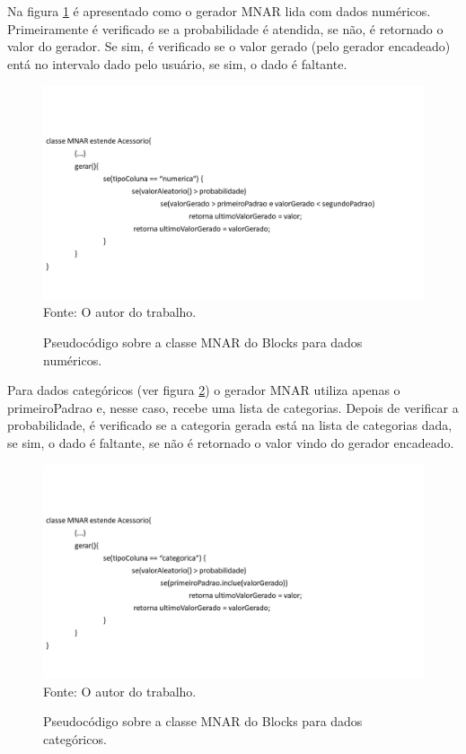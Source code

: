 \documentclass[
	12pt,				%
	openright,			%
	oneside,			%
	a4paper,			%
	english,			%
	brazil				%
	]{abntex2}
\begin{document}
		\par
		Na figura \ref{fig:MNARNum} é apresentado como o gerador MNAR lida com dados numéricos.
		Primeiramente é verificado se a probabilidade é atendida, se não, é retornado o valor do gerador.
		Se sim, é verificado se o valor gerado (pelo gerador encadeado) entá no intervalo dado pelo usuário, se sim, o dado é faltante.
		\begin{figure}[h!]
			\centering
			\caption{Pseudocódigo sobre a classe MNAR do Blocks para dados numéricos.}
			\includegraphics[width=\linewidth]{./figures/prototipo/MNARNum.png}
			\label{fig:MNARNum}
			\footnotesize Fonte: O autor do trabalho.
		\end{figure}
		Para dados categóricos (ver figura \ref{fig:MNARCat}) o gerador MNAR utiliza apenas o primeiroPadrao e, nesse caso, recebe uma lista de categorias.
		Depois de verificar a probabilidade, é verificado se a categoria gerada está na lista de categorias dada, se sim, o dado é faltante, se não é retornado o valor vindo do gerador encadeado.
		\begin{figure}[h!]
			\centering
			\caption{Pseudocódigo sobre a classe MNAR do Blocks para dados categóricos.}
			\includegraphics[width=\linewidth]{./figures/prototipo/MNARCat.png}
			\label{fig:MNARCat}
			\footnotesize Fonte: O autor do trabalho.
		\end{figure}
\end{document}
